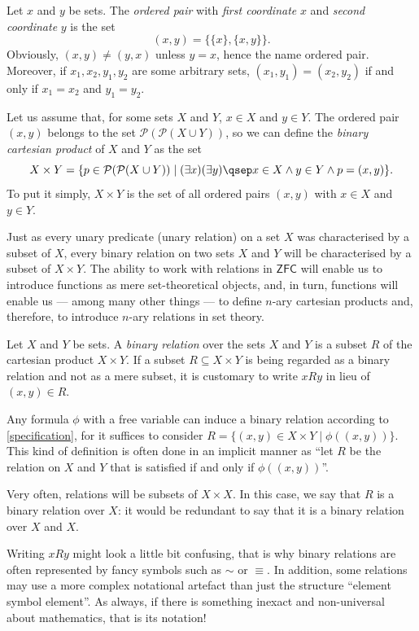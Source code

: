 \begin{definition}
Let $x$ and $y$ be sets. The \emph{ordered pair} with \emph{first coordinate} $x$ and \emph{second coordinate} $y$ is the set
\[ (x,y) = \{ \{x\}, \{x,y\} \}.\]
Obviously, $(x,y) \neq (y,x)$ unless $y = x$, hence the name ordered pair.
Moreover, if $x_1,x_2,y_1,y_2$ are some arbitrary sets, $(x_1,y_1) = (x_2,y_2)$ if and only if $x_1 = x_2$ and $y_1 = y_2$.

Let us assume that, for some sets $X$ and $Y$, $x\in X$ and $y\in Y$. The ordered pair $(x,y)$ belongs to the set $\mathcal{P}(\mathcal{P}(X\cup Y))$, so we can define the \emph{binary cartesian product} of $X$ and $Y$ as the set
\[ X\times Y = \{p \in \mathcal{P}(\mathcal{P}(X\cup Y)) \mid (\exists x)(\exists y)\qsep x\in X \land y\in Y \land p = (x,y)\}.\]
To put it simply, $X\times Y$ is the set of all ordered pairs $(x,y)$ with $x\in X$ and $y\in Y$.
\label{<+label+>}
\end{definition}

\begin{para}
Just as every unary predicate (unary relation) on a set $X$ was characterised by a subset of $X$, every binary relation on two sets $X$ and $Y$ will be characterised by a subset of $X\times Y$.
The ability to work with relations in $\mathsf{ZFC}$ will enable us to introduce functions as mere set-theoretical objects, and, in turn, functions will enable us --- among many other things --- to define $n$-ary cartesian products and, therefore, to introduce $n$-ary relations in set theory.
\end{para}

\begin{definition}
\label{binrel}
Let $X$ and $Y$ be sets. A \emph{binary relation} over the sets $X$ and $Y$ is a subset $R$ of the cartesian product $X\times Y$.
If a subset $R\subseteq X\times Y$ is being regarded as a binary relation and not as a mere subset, it is customary to write $xRy$ in lieu of $(x,y) \in R$.

Any formula $\phi$ with a free variable can induce a binary relation according to \ref{specification}, for it suffices to consider $R = \{(x,y)\in X\times Y \mid \phi ( ( x,y) )\}$.
This kind of definition is often done in an implicit manner as ``let $R$ be the relation on $X$ and $Y$ that is satisfied if and only if $\phi( (x,y))$''.

Very often, relations will be subsets of $X\times X$. In this case, we say that $R$ is a binary relation over $X$: it would be redundant to say that it is a binary relation over $X$ and $X$.

Writing $xRy$ might look a little bit confusing, that is why binary relations are often represented by fancy symbols such as $\sim$ or $\equiv$.
In addition, some relations may use a more complex notational artefact than just the structure ``element symbol element''.
As always, if there is something inexact and non-universal about mathematics, that is its notation! 


\label{<+label+>}
\end{definition}

